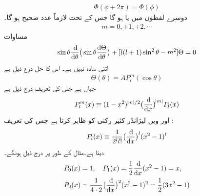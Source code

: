\begin{align}
\Phi(\phi+2\pi)=\Phi(\phi) 
\end{align}
دوسرے لفظوں میں   یا  ہو گا جس کے تحت  لازماً عدد صحیح ہو گا۔
\begin{align}
m=0,\pm 1,\pm 2,\cdots
\end{align}
 مساوات  
\begin{align}\label{مساوات_ابعادی_تھیٹا_مساوات}
\sin{\theta}\frac{\dif}{\dif{\theta}}\big(\sin{\theta}\frac{\dif{\Theta}}{\dif{\theta}}\big)+[l(l+1)\sin^{2}{\theta}-m^{2}]\Theta=0 
\end{align}
اتنی سادہ نہیں ہے۔ اس کا حل درج ذیل ہے
\begin{align}
\Theta(\theta)=AP_{l}^{m}(\cos{\theta}) 
\end{align}
جہاں      ہے جس کی تعریف درج ذیل ہے
\begin{align}\label{مساوات_ابعادی_شریک_لیژانڈر_تفاعلات_تعریف}
P_{l}^{m}(x)\equiv (1-x^{2})^{\abs{m}/2}\big(\frac{\dif}{\dif{x}}\big)^{\abs{m}}P_{l}(x) 
\end{align}
اور  ویں لیژانڈر کثیر رکنی  کو     ظاہر کرتا ہے جس کی تعریف :
\begin{align}\label{مساوات_ابعادی_روڈریگیس}
P_{l}(x)\equiv\frac{1}{2^{l}l!}\big(\frac{\dif}{\dif{x}}\big)^{l}(x^{2}-1)^{l} 
\end{align}
دیتا ہے۔مثال کے طور پر درج ذیل ہونگے۔
\begin{align*}
P_{0}(x)&=1,\quad P_{1}(x)=\frac{1}{2}\frac{\dif}{\dif{x}}(x^{2}-1)=x ,\\
P_{2}(x)&=\frac{1}{4\cdot 2}\big(\frac{\dif}{\dif{x}}\big)^{2}(x^{2}-1)^{2}=\frac{1}{2}(3x^{2}-1) 
\end{align*}
%

